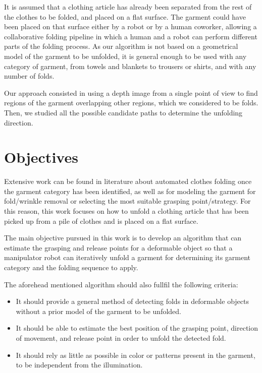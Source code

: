 It is assumed that a clothing article has already been separated from the rest of the clothes to be folded, and placed on a flat surface. The garment could have been placed on that surface either by a robot or by a human coworker, allowing a collaborative folding pipeline in which a human and a robot can perform different parts of the folding process.
As our algorithm is not based on a geometrical model of the garment to be unfolded, it is general enough to be used with any category of garment, from towels and blankets to trousers or shirts, and with any number of folds. 

Our approach consisted in using a depth image from a single point of view to find regions of the garment overlapping other regions, which we considered to be folds. Then, we studied all the possible candidate paths to determine the unfolding direction. 

\section{Objectives}
\label{intro_objectives}
Extensive work can be found in literature about automated clothes folding once the garment category has been identified, as well as for modeling the garment for fold/wrinkle removal or selecting the most suitable grasping point/strategy. For this reason, this work focuses on how to unfold a clothing article that has been picked up from a pile of clothes and is placed on a flat surface.

The main objective pursued in this work is to develop an algorithm that can estimate the grasping and release points for a deformable object so that a manipulator robot can iteratively unfold a garment for determining its garment category and the folding sequence to apply.

The aforehead mentioned algorithm should also fullfil the following criteria:

\begin{itemize}
	\item It should provide a general method of detecting folds in deformable objects without a prior model of the garment to be unfolded.
	\item It should be able to estimate the best position of the grasping point, direction of movement, and release point in order to unfold the detected fold.
	\item It should rely as little as possible in color or patterns present in the garment, to be independent from the illumination.
\end{itemize}

